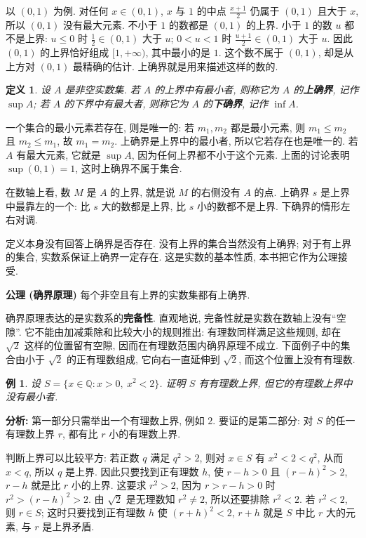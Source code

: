 \documentclass[UTF8,openany]{ctexbook}
\theoremstyle{chinesetextbook}
\newtheorem{definition}{定义}[section]
\newtheorem{example}{例}[section]
\begin{document}
以 $(0,1)$ 为例. 对任何 $x\in(0,1)$, $x$ 与 $1$ 的中点 $\displaystyle\frac{x+1}2$ 仍属于 $(0,1)$ 且大于 $x$, 所以 $(0,1)$ 没有最大元素. 不小于 $1$ 的数都是 $(0,1)$ 的上界. 小于 $1$ 的数 $u$ 都不是上界: $u\le0$ 时 $\displaystyle\frac12\in(0,1)$ 大于 $u$; $0<u<1$ 时 $\displaystyle\frac{u+1}2\in(0,1)$ 大于 $u$. 因此 $(0,1)$ 的上界恰好组成 $[1,+\infty)$, 其中最小的是 $1$. 这个数不属于 $(0,1)$, 却是从上方对 $(0,1)$ 最精确的估计. 上确界就是用来描述这样的数的.
\begin{definition}
设 $A$ 是非空实数集. 若 $A$ 的上界中有最小者, 则称它为 $A$ 的\textbf{上确界}, 记作 $\sup A$; 若 $A$ 的下界中有最大者, 则称它为 $A$ 的\textbf{下确界}, 记作 $\inf A$.
\end{definition}
一个集合的最小元素若存在, 则是唯一的: 若 $m_1,m_2$ 都是最小元素, 则 $m_1\le m_2$ 且 $m_2\le m_1$, 故 $m_1=m_2$. 上确界是上界中的最小者, 所以它若存在也是唯一的. 若 $A$ 有最大元素, 它就是 $\sup A$, 因为任何上界都不小于这个元素. 上面的讨论表明 $\sup(0,1)=1$, 这时上确界不属于集合.

在数轴上看, 数 $M$ 是 $A$ 的上界, 就是说 $M$ 的右侧没有 $A$ 的点. 上确界 $s$ 是上界中最靠左的一个: 比 $s$ 大的数都是上界, 比 $s$ 小的数都不是上界. 下确界的情形左右对调.

定义本身没有回答上确界是否存在. 没有上界的集合当然没有上确界; 对于有上界的集合, 实数系保证上确界一定存在. 这是实数的基本性质, 本书把它作为公理接受.

\par\indent\textbf{公理 (确界原理)} 每个非空且有上界的实数集都有上确界.

确界原理表达的是实数系的\textbf{完备性}. 直观地说, 完备性就是实数在数轴上没有“空隙”. 它不能由加减乘除和比较大小的规则推出: 有理数同样满足这些规则, 却在 $\sqrt2$ 这样的位置留有空隙, 因而在有理数范围内确界原理不成立. 下面例子中的集合由小于 $\sqrt2$ 的正有理数组成, 它向右一直延伸到 $\sqrt2$, 而这个位置上没有有理数.
\begin{example}
设 $S=\{x\in\mathbb Q:x>0,\ x^2<2\}$. 证明 $S$ 有有理数上界, 但它的有理数上界中没有最小者.
\end{example}
\par\indent\textbf{分析:} 第一部分只需举出一个有理数上界, 例如 $2$. 要证的是第二部分: 对 $S$ 的任一有理数上界 $r$, 都有比 $r$ 小的有理数上界.

判断上界可以比较平方: 若正数 $q$ 满足 $q^2>2$, 则对 $x\in S$ 有 $x^2<2<q^2$, 从而 $x<q$, 所以 $q$ 是上界. 因此只要找到正有理数 $h$, 使 $r-h>0$ 且 $(r-h)^2>2$, $r-h$ 就是比 $r$ 小的上界. 这要求 $r^2>2$, 因为 $r>r-h>0$ 时 $r^2>(r-h)^2>2$. 由 $\sqrt2$ 是无理数知 $r^2\ne2$, 所以还要排除 $r^2<2$. 若 $r^2<2$, 则 $r\in S$; 这时只要找到正有理数 $h$ 使 $(r+h)^2<2$, $r+h$ 就是 $S$ 中比 $r$ 大的元素, 与 $r$ 是上界矛盾.
\end{document}

